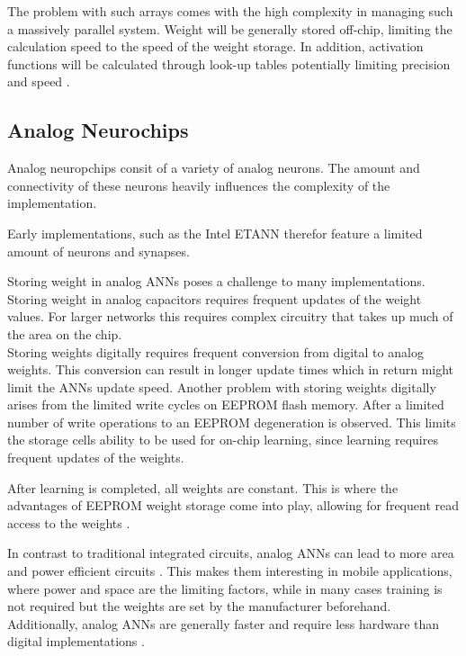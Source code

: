 \documentclass[conference]{IEEEtran}
\begin{document}
    The problem with such arrays comes with the high complexity in managing such a massively parallel system.
    Weight will be generally stored off-chip, limiting the calculation speed to the speed of the weight storage.
    In addition, activation functions will be calculated through look-up tables potentially limiting precision and speed \cite{dias2004artificial}.



    \subsection{Analog Neurochips}

    Analog neuropchips consit of a variety of analog neurons.
    The amount and connectivity of these neurons heavily influences the complexity of the implementation.

    Early implementations, such as the Intel ETANN therefor feature a limited amount of neurons and synapses.

    Storing weight in analog ANNs poses a challenge to many implementations.
    Storing weight in analog capacitors requires frequent updates of the weight values.
    For larger networks this requires complex circuitry that takes up much of the area on the chip.
    \\
    Storing weights digitally requires frequent conversion from digital to analog weights.
    This conversion can result in longer update times which in return might limit the ANNs update speed.
    Another problem with storing weights digitally arises from the limited write cycles on EEPROM flash memory.
    After a limited number of write operations to an EEPROM degeneration is observed.
    This limits the storage cells ability to be used for on-chip learning, since learning requires frequent updates of the weights.

    After learning is completed, all weights are constant.
    This is where the advantages of EEPROM weight storage come into play, allowing for frequent read access to the weights \cite{holler1989electrically}.


    In contrast to traditional integrated circuits, analog ANNs can lead to more area and power efficient circuits \cite{forssell2014hardware}.
    This makes them interesting in mobile applications, where power and space are the limiting factors, while in many cases training is not required but the weights are set by the manufacturer beforehand.
    Additionally, analog ANNs are generally faster and require less hardware than digital implementations \cite{hollis1990artificial}.
\end{document}
